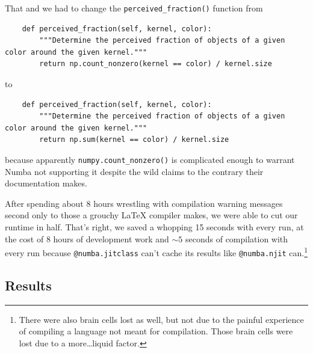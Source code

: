 \documentclass[12pt]{article}
\begin{document}
That and we had to change the \texttt{perceived_fraction()} function from
\begin{verbatim}
    def perceived_fraction(self, kernel, color):
        """Determine the perceived fraction of objects of a given color around the given kernel."""
        return np.count_nonzero(kernel == color) / kernel.size
\end{verbatim}
to
\begin{verbatim}
    def perceived_fraction(self, kernel, color):
        """Determine the perceived fraction of objects of a given color around the given kernel."""
        return np.sum(kernel == color) / kernel.size
\end{verbatim}
because apparently \texttt{numpy.count_nonzero()} is complicated enough to warrant Numba not supporting it despite the wild claims to the contrary their documentation makes.

After spending about 8 hours wrestling with compilation warning messages second only to those a grouchy \LaTeX{} compiler makes, we were able to cut our runtime in half.
That's right, we saved a whopping 15 seconds with every run, at the cost of 8 hours of development work and $\sim 5$ seconds of compilation with every run because \texttt{@numba.jitclass} can't cache its results like \texttt{@numba.njit} can.\footnote{There were also brain cells lost as well, but not due to the painful experience of compiling a language not meant for compilation. Those brain cells were lost due to a more\dots liquid factor.}

\subsection{Results}
\end{document}
